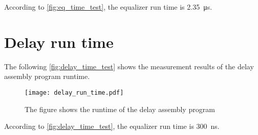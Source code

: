 According to \autoref{fig:eq_time_test}, the equalizer run time is \SI{2.35}{\micro\second}.

\section*{Delay run time}
The following \autoref{fig:delay_time_test} shows the measurement results of the delay assembly program runtime.
\begin{figure}[htbp!]
	\centering
		\texttt{[image: delay\_run\_time.pdf]}
		\caption{The figure shows the runtime of the delay assembly program}
		\label{fig:delay_time_test}
\end{figure}

According to \autoref{fig:delay_time_test}, the equalizer run time is \SI{300}{\nano\second}.